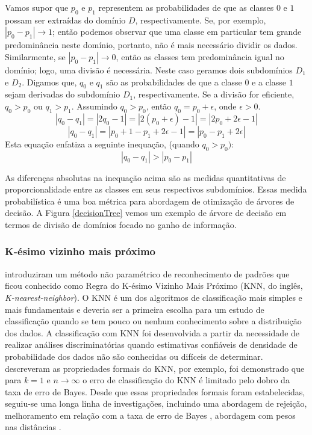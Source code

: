 Vamos supor que \(p_0\) e \(p_1\) representem as probabilidades de que as
classes \(0\) e \(1\) possam ser extraídas do domínio \(D\), respectivamente.
Se, por exemplo, \(|p_0 - p_1| \to 1\); então podemos observar que uma classe em
particular tem grande predominância neste domínio, portanto, não é mais
necessário dividir os dados. Similarmente, se \(|p_0 - p_1| \to 0\), então as
classes tem predominância igual no domínio; logo, uma divisão é necessária.
Neste caso geramos dois subdomínios \(D_1\) e \(D_2\). Digamos que, \(q_0\) e
\(q_1\) são as probabilidades de que a classe \(0\) e a classe \(1\) sejam
derivadas do subdomínio \(D_1\), respectivamente. Se a divisão for eficiente,
\(q_0 > p_0\) ou \(q_1 > p_1\). Assumindo \(q_0 > p_0\), então \(q_0 = p_0 +
\epsilon\), onde \(\epsilon > 0\).
\[|q_0 - q_1| = |2q_0 - 1| = |2(p_0 + \epsilon) - 1| = |2p_0 + 2\epsilon - 1|\]
\[|q_0 - q_1| = |p_0 + 1 - p_1 + 2\epsilon - 1| = |p_0 - p_1 + 2\epsilon|\]
Esta equação enfatiza a seguinte inequação, (quando \(q_0 > p_0)\):
\[|q_0 - q_1| > |p_0 - p_1|\]

As diferenças absolutas na inequação acima são as medidas quantitativas de
proporcionalidade entre as classes em seus respectivos subdomínios. Essas medida
probabilística é uma boa métrica para abordagem de otimização de árvores de
decisão. A Figura \ref{decisionTree} vemos um exemplo de árvore de decisão em
termos de divisão de domínios focado no ganho de informação.


\subsubsection{K-ésimo vizinho mais próximo}

 introduziram um método não paramétrico de
reconhecimento de padrões que ficou conhecido como Regra do K-ésimo Vizinho Mais
Próximo (KNN, do inglês, \textit{K-nearest-neighbor}). O KNN é um dos algoritmos
de classificação mais simples e mais fundamentais e deveria ser a primeira
escolha para um estudo de classificação quando se tem pouco ou nenhum
conhecimento sobre a distribuição dos dados. A classificação com KNN foi
desenvolvida a partir da necessidade de realizar análises discriminatórias
quando estimativas confiáveis de densidade de probabilidade dos dados não são
conhecidas ou difíceis de determinar.  descreveram
as propriedades formais do KNN, por exemplo, foi demonstrado que para \(k = 1\)
e \(n \to \infty\) o erro de classificação do KNN é limitado pelo dobro da taxa
de erro de Bayes. Desde que essas propriedades formais foram estabelecidas,
seguiu-se uma longa linha de investigações, incluindo uma abordagem de rejeição,
melhoramento em relação com a taxa de erro de Bayes , abordagem com pesos nas
distâncias \cite{peterson2009knn}.

